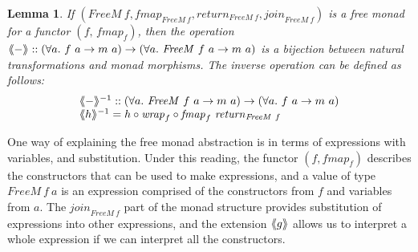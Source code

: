 \documentclass{jfp1}
\newcommand{\fmext}[1]{\langle\kern-0.25em\langle #1 \rangle\kern-0.25em\rangle}
\newtheorem{lemma}{Lemma}
\begin{document}
\begin{lemma}
  If $(\mathit{FreeM}~f, \mathit{fmap}_{\mathit{FreeM}~f},
  \mathit{return}_{\mathit{FreeM}~f},
  \mathit{join}_{\mathit{FreeM}~f})$ is a free monad for a functor
  $(f, \,\mathit{fmap}_f)$, then the operation $\fmext{-} :: (\forall
  a.~f~a \to m~a) \to (\forall a.~\mathit{FreeM}~f~a \to m~a)$ is a
  bijection between natural transformations and monad morphisms. The
  inverse operation can be defined as follows:
  \begin{displaymath}
    \begin{array}{l}
      \fmext{-}^{-1} :: (\forall a.~\mathit{FreeM}~f~a \to m~a) \to (\forall a.~f~a \to m~a) \\
      \fmext{h}^{-1} = h \circ \mathit{wrap}_f \circ \mathit{fmap}_f~\mathit{return}_{\mathit{FreeM}~f}
    \end{array}
  \end{displaymath}
\end{lemma}

One way of explaining the free monad abstraction is in terms of
expressions with variables, and substitution. Under this reading, the
functor $(f,\mathit{fmap}_f)$ describes the constructors that can be
used to make expressions, and a value of type $\mathit{FreeM}~f~a$ is
an expression comprised of the constructors from $f$ and variables
from $a$. The $\mathit{join}_{\mathit{FreeM}~f}$ part of the monad
structure provides substitution of expressions into other expressions,
and the extension $\fmext{g}$ allows us to interpret a whole
expression if we can interpret all the constructors.
\end{document}
